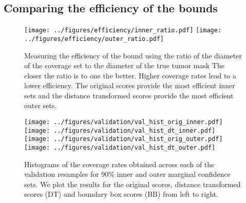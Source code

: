 
\subsection{Comparing the efficiency of the bounds}
\begin{figure}
	\begin{center}
			\texttt{[image: ../figures/efficiency/inner\_ratio.pdf]}
			\quad\quad
		\texttt{[image: ../figures/efficiency/outer\_ratio.pdf]}
	\end{center}
	\caption{Measuring the efficiency of the bound using the ratio of the diameter of the coverage set to the diameter of the true tumor mask The closer the ratio is to one the better. Higher coverage rates lead to a lower efficiency. The original scores provide the most efficient inner sets and the distance transformed scores provide the most efficient outer sets.}\label{fig:efficiency}
\end{figure}

\begin{figure}
	\begin{center}
		\texttt{[image: ../figures/validation/val\_hist\_orig\_inner.pdf]}
		\texttt{[image: ../figures/validation/val\_hist\_dt\_inner.pdf]}\\
		\texttt{[image: ../figures/validation/val\_hist\_orig\_outer.pdf]}
		\texttt{[image: ../figures/validation/val\_hist\_dt\_outer.pdf]}
	\end{center}
	\caption{Histograms of the coverage rates obtained across each of the validation resamples for 90\% inner and outer marginal confidence sets. We plot the results for the original scores, distance transformed scores (DT) and boundary box scores (BB) from left to right.}\label{fig:valhist}
\end{figure}

